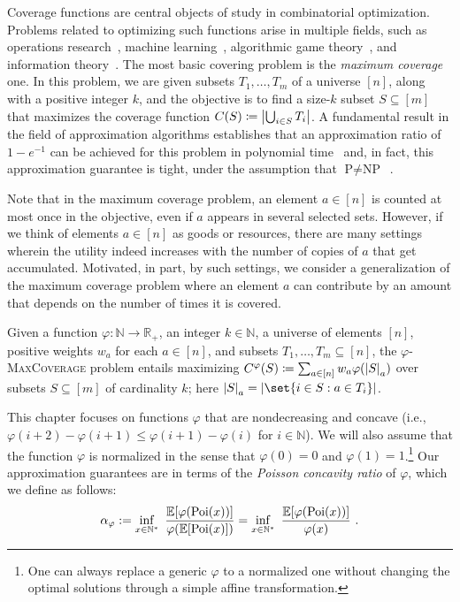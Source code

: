 Coverage functions are central objects of study in combinatorial optimization. Problems related to optimizing such functions arise in multiple fields, such as operations research~\cite{CFN77}, machine learning~\cite{FK14}, algorithmic game theory~\cite{DV15}, and information theory~\cite{BF18}. The most basic covering problem is the \emph{maximum coverage} one. In this problem, we are given subsets $T_1, \ldots, T_m$ of a universe $[n]$, along with a positive integer $k$, and the objective is to find a size-$k$ subset $S \subseteq [m]$ that maximizes the coverage function $C(S) \coloneqq  \abs{\bigcup_{i \in S} T_i}$. A fundamental result in the field of approximation algorithms establishes that an approximation ratio of $1-e^{-1}$ can be achieved for this problem in polynomial time~\cite{Hochbaum96} and, in fact, this approximation guarantee is tight, under the assumption that $\textrm{P} \not= \textrm{NP}$~\cite{Feige98}.

Note that in the maximum coverage problem, an element $a \in [n]$ is counted at most once in the objective, even if $a$ appears in several selected sets. However, if we think of elements $a \in [n]$ as goods or resources, there are many settings wherein the utility indeed increases with the number of copies of $a$ that get accumulated. Motivated, in part, by such settings, we consider a generalization of the maximum coverage problem where an element $a$ can contribute by an amount that depends on the number of times it is covered. 

Given a function $\varphi: \mathbb{N} \rightarrow \mathbb{R}_+$, an integer $k \in \mathbb{N}$, a universe of elements $[n]$, positive weights $w_a$ for each $a \in [n]$, and  subsets $T_1,\ldots,T_m \subseteq [n]$, the $\varphi$-\textsc{MaxCoverage} problem entails maximizing $C^{\varphi}(S) \coloneqq \sum_{a \in [n]}w_a  \varphi(\abs{S}_a)$ over subsets $S \subseteq [m]$ of cardinality $k$; here $\abs{S}_a = \abs{\set{i \in S : a \in T_i}}$.

This chapter focuses on functions $\varphi$ that are nondecreasing and concave (i.e., $\varphi(i+2) - \varphi(i+1) \leq \varphi(i+1) - \varphi(i)$ for $i \in \mathbb{N}$). We will also assume that the function $\varphi$ is normalized in the sense that $\varphi(0) = 0$ and $\varphi(1) = 1$.\footnote{One can always replace a generic $\varphi$ to a normalized one without changing the optimal solutions through a simple affine transformation.} Our approximation guarantees are in terms of the \emph{Poisson concavity ratio} of $\varphi$, which we define as follows:
\begin{align}
\label{eq:def-alpha-varphi}
\alpha_{\varphi} := \inf_{x \in \mathbb{N}^*} \ \frac{\mathbb{E}[\varphi(\Poi(x))]}{\varphi(\mathbb{E}[\Poi(x)])} =  \inf_{x \in \mathbb{N}^*} \ \frac{\mathbb{E}[\varphi(\Poi(x))]}{\varphi(x)} \ .
\end{align} 

